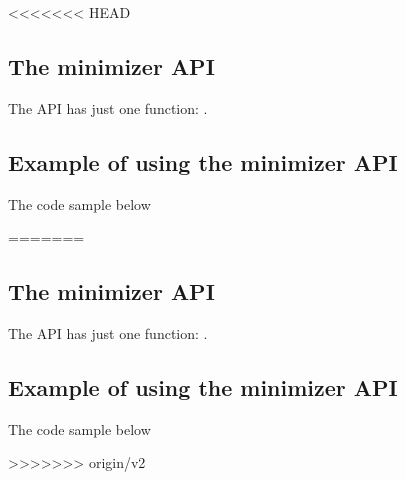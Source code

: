 <<<<<<< HEAD



\subsection{The minimizer API}

The  API has just one function:
.

\subsection{Example of using the minimizer API}

The code sample below 


=======



\subsection{The minimizer API}

The  API has just one function:
.

\subsection{Example of using the minimizer API}

The code sample below 


>>>>>>> origin/v2
